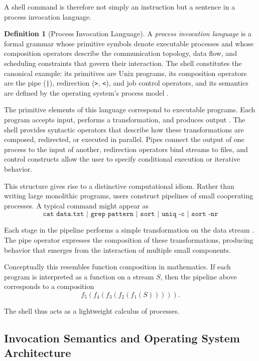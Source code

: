 \documentclass[12pt]{article}
\theoremstyle{definition}
\newtheorem{definition}{Definition}[section]
\begin{document}
A shell command is therefore not simply an instruction but a sentence in
a process invocation language.

\begin{definition}[Process Invocation Language]
A \emph{process invocation language} is a formal grammar whose primitive
symbols denote executable processes and whose composition operators
describe the communication topology, data flow, and scheduling
constraints that govern their interaction. The shell constitutes the
canonical example: its primitives are Unix programs, its composition
operators are the pipe (\texttt{|}), redirection (\texttt{>},
\texttt{<}), and job control operators, and its semantics are defined
by the operating system's process model \cite{ritchie1974}.
\end{definition}

The primitive elements of this language correspond to executable
programs. Each program accepts input, performs a transformation, and
produces output \cite{mcilroy1978}. The shell provides syntactic
operators that describe how these transformations are composed,
redirected, or executed in parallel. Pipes connect the output of one
process to the input of another, redirection operators bind streams to
files, and control constructs allow the user to specify conditional
execution or iterative behavior.

This structure gives rise to a distinctive computational idiom. Rather
than writing large monolithic programs, users construct pipelines of
small cooperating processes. A typical command might appear as
\[
\texttt{cat data.txt | grep pattern | sort | uniq -c | sort -nr}
\]

Each stage in the pipeline performs a simple transformation on the data
stream \cite{raymond2003}. The pipe operator expresses the composition
of these transformations, producing behavior that emerges from the
interaction of multiple small components.

Conceptually this resembles function composition in mathematics. If
each program is interpreted as a function on a stream $S$, then the
pipeline above corresponds to a composition
\[
f_5(f_4(f_3(f_2(f_1(S))))).
\]

The shell thus acts as a lightweight calculus of processes.

\subsection{Invocation Semantics and Operating System Architecture}
\end{document}
